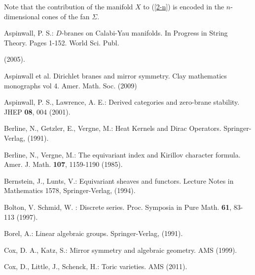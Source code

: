 \documentclass[xypic,amscd,syntonly,amssymb,verbatim,12pt]{amsart}
\theoremstyle{plain}
\theoremstyle{definition}
\theoremstyle{remark}
\numberwithin{equation}{section}
\begin{document}
Note that
 the contribution of the manifold  $X$ to (\ref{2-n}) is encoded in the $n$-dimensional
cones of the fan $\Sigma$.





\begin{thebibliography}{99}










  Aspinwall, P. S.: $D$-branes on Calabi-Yau manifolds.
  In Progress in String Theory. Pages 1-152. World Sci. Publ.
  
  (2005).




Aspinwall et al. Dirichlet branes and mirror symmetry. Clay
mathematics monographs vol 4. Amer. Math. Soc. (2009)



Aspinwall, P. S., Lawrence, A. E.: Derived categories and
zero-brane stability. JHEP {\bf 08}, 004 (2001).





 


  Berline, N.,  Getzler, E.,  Vergne,  M.:
   Heat Kernels and Dirac Operators.
Springer-Verlag, (1991).



Berline, N.,    Vergne,  M.: The equivariant index and Kirillov
character formula. Amer. J. Math. {\bf 107}, 1159-1190 (1985).




 Bernstein, J., Lunts, V.: Equivariant sheaves and functors.
 Lecture Notes in Mathematics 1578, Springer-Verlag,
 (1994).



 

Bolton, V. Schmid, W. : Discrete series. Proc. Symposia in Pure
Math. {\bf 61}, 83-113 (1997).


Borel, A.: Linear algebraic groups. Springer-Verlag, (1991).


 



 
 
 

 Cox, D. A., Katz, S.: Mirror symmetry and algebraic geometry. AMS (1999).


 Cox, D., Little, J., Schenck, H.: Toric varieties. AMS (2011).



\end{thebibliography}
\end{document}
